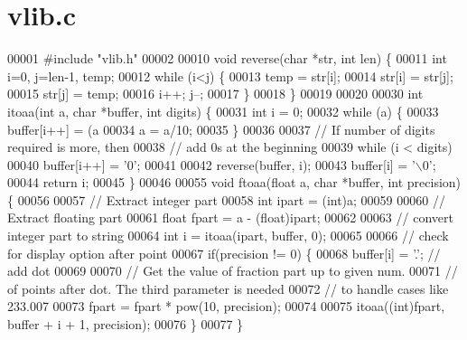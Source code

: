 \section{vlib.\+c}
\label{vlib_8c_source}

\begin{DoxyCode}
00001 \textcolor{preprocessor}{#include "vlib.h"}
00002 
00010 \textcolor{keywordtype}{void} reverse(\textcolor{keywordtype}{char} *str, \textcolor{keywordtype}{int} len) \{
00011     \textcolor{keywordtype}{int} i=0, j=len-1, temp;
00012     \textcolor{keywordflow}{while} (i<j) \{
00013         temp = str[i];
00014         str[i] = str[j];
00015         str[j] = temp;
00016         i++; j--;
00017     \}
00018 \}
00019 
00020 
00030 \textcolor{keywordtype}{int} itoaa(\textcolor{keywordtype}{int} a, \textcolor{keywordtype}{char} *buffer, \textcolor{keywordtype}{int} digits) \{
00031   \textcolor{keywordtype}{int} i = 0;
00032    \textcolor{keywordflow}{while} (a) \{
00033        buffer[i++] = (a%
00034        a = a/10;
00035    \}
00036 
00037    \textcolor{comment}{// If number of digits required is more, then}
00038    \textcolor{comment}{// add 0s at the beginning}
00039    \textcolor{keywordflow}{while} (i < digits)
00040        buffer[i++] = \textcolor{charliteral}{'0'};
00041 
00042    reverse(buffer, i);
00043    buffer[i] = \textcolor{charliteral}{'\(\backslash\)0'};
00044    \textcolor{keywordflow}{return} i;
00045 \}
00046 
00055 \textcolor{keywordtype}{void} ftoaa(\textcolor{keywordtype}{float} a, \textcolor{keywordtype}{char} *buffer, \textcolor{keywordtype}{int} precision) \{
00056 
00057   \textcolor{comment}{// Extract integer part}
00058   \textcolor{keywordtype}{int} ipart = (int)a;
00059 
00060   \textcolor{comment}{// Extract floating part}
00061   \textcolor{keywordtype}{float} fpart = a - (float)ipart;
00062 
00063   \textcolor{comment}{// convert integer part to string}
00064   \textcolor{keywordtype}{int} i = itoaa(ipart, buffer, 0);
00065 
00066   \textcolor{comment}{// check for display option after point}
00067   \textcolor{keywordflow}{if}(precision != 0) \{
00068     buffer[i] = \textcolor{charliteral}{'.'};  \textcolor{comment}{// add dot}
00069 
00070     \textcolor{comment}{// Get the value of fraction part up to given num.}
00071     \textcolor{comment}{// of points after dot. The third parameter is needed}
00072     \textcolor{comment}{// to handle cases like 233.007}
00073     fpart = fpart * pow(10, precision);
00074 
00075     itoaa((\textcolor{keywordtype}{int})fpart, buffer + i + 1, precision);
00076   \}
00077 \}
\end{DoxyCode}

